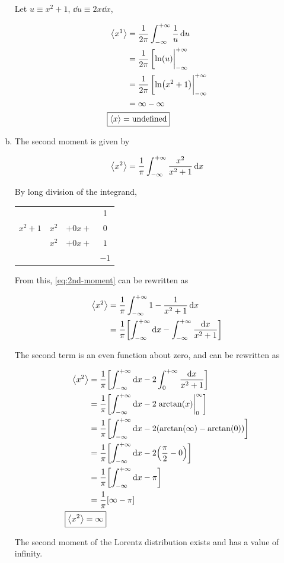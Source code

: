 \documentclass[12pt,a4paper,twocolumn]{article}
\begin{document}
\begin{enumerate}[(a)]
Let $u \equiv x^2 + 1$, $\dd{u} \equiv 2x\dd{x}$,

\begin{align}
	\ev{x^1} &= \frac{1}{2\pi} \int_{-\infty}^{+\infty} \frac{1}{u}\dd{u} \nonumber \\
	&= \frac{1}{2\pi} \eval[\ln(u)|_{-\infty}^{+\infty} \nonumber \\
	&= \frac{1}{2\pi} \eval[\ln(x^2 + 1)|_{-\infty}^{+\infty} \nonumber \\
	&= \infty - \infty \nonumber \\
	\Aboxed{
		\ev{x} &= \mathrm{undefined}
	} \label{eq:answer-b}
\end{align}

\item The second moment is given by

\begin{equation}\label{eq:2nd-moment}
	\ev{x^2} = \frac{1}{\pi} \int_{-\infty}^{+\infty} \frac{x^2}{x^2 +1}\dd{x}
\end{equation}

By long division of the integrand,

\begin{center}
	\begin{tabular}{c|ccc}
		&&& 1 \\ \cline{2-4}
		$x^2 + 1$ & $x^2$ & $+0x+$ & $0$ \\
		& $x^2$ & $+0x+$ & $1$ \\ \cline{2-4}
		&&& $-1$
	\end{tabular}
\end{center}

From this, \eqref{eq:2nd-moment} can be rewritten as

\begin{align*}
	\ev{x^2} &= \frac{1}{\pi} \int_{-\infty}^{+\infty} 1 - \frac{1}{x^2 + 1} \dd{x} \\
	&= \frac{1}{\pi}\qty[\int_{-\infty}^{+\infty} \dd{x} - \int_{-\infty}^{+\infty} \frac{\dd{x}}{x^2 + 1}]
\end{align*}

The second term is an even function about zero, and can be rewritten as

\begin{align}
	\ev{x^2} &= \frac{1}{\pi}\qty[\int_{-\infty}^{+\infty} \dd{x} - 2\int_0^{+\infty} \frac{\dd{x}}{x^2 + 1}] \nonumber \\
	&= \frac{1}{\pi}\qty[\int_{-\infty}^{+\infty} \dd{x} - 2\eval{\arctan(x)}_0^\infty] \nonumber \\
	&= \frac{1}{\pi}\qty[\int_{-\infty}^{+\infty} \dd{x} - 2\qty(\arctan(\infty) - \arctan(0))] \nonumber \\
	&= \frac{1}{\pi}\qty[\int_{-\infty}^{+\infty} \dd{x} - 2\qty(\frac{\pi}{2} - 0)] \nonumber \\
	&= \frac{1}{\pi}\qty[\int_{-\infty}^{+\infty} \dd{x} - \pi] \nonumber \\
	&= \frac{1}{\pi} \qty[\infty - \pi] \nonumber \\
	\Aboxed{
		\ev{x^2} &= \infty
	} \label{eq:answer-c}
\end{align}

The second moment of the Lorentz distribution exists and has a value of infinity.

\end{enumerate}
\end{document}
